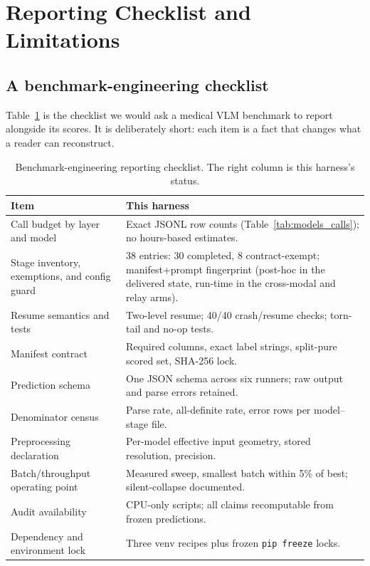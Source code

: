 \section{Reporting Checklist and Limitations}
\label{sec:checklist}

\subsection{A benchmark-engineering checklist}

Table~\ref{tab:checklist} is the checklist we would ask a medical VLM benchmark to report alongside its scores. It is deliberately short: each item is a fact that changes what a reader can reconstruct.

\begin{table}[t]
\centering
\footnotesize
\setlength{\tabcolsep}{3pt}
\caption{Benchmark-engineering reporting checklist. The right column is this harness's status.}
\label{tab:checklist}
\begin{tabular}{p{}p{}}
\toprule
Item & This harness \\
\midrule
Call budget by layer and model & Exact JSONL row counts (Table~\ref{tab:models_calls}); no hours-based estimates. \\
Stage inventory, exemptions, and config guard & 38 entries: 30 completed, 8 contract-exempt; manifest+prompt fingerprint (post-hoc in the delivered state, run-time in the cross-modal and relay arms). \\
Resume semantics and tests & Two-level resume; 40/40 crash/resume checks; torn-tail and no-op tests. \\
Manifest contract & Required columns, exact label strings, split-pure scored set, SHA-256 lock. \\
Prediction schema & One JSON schema across six runners; raw output and parse errors retained. \\
Denominator census & Parse rate, all-definite rate, error rows per model--stage file. \\
Preprocessing declaration & Per-model effective input geometry, stored resolution, precision. \\
Batch/throughput operating point & Measured sweep, smallest batch within 5\% of best; silent-collapse documented. \\
Audit availability & CPU-only scripts; all claims recomputable from frozen predictions. \\
Dependency and environment lock & Three venv recipes plus frozen \texttt{pip freeze} locks. \\
\bottomrule
\end{tabular}
\end{table}

